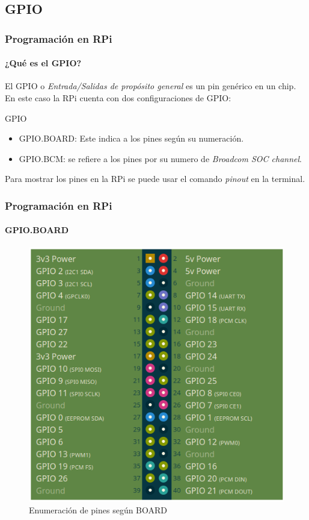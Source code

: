 \documentclass{beamer}
\begin{document}
	\subsection{GPIO}
	\begin{frame}
		\frametitle{Programación en RPi}
		\framesubtitle{¿Qué es el GPIO?}
		El GPIO o \textit{Entrada/Salidas de propósito general} es un pin genérico en un chip. En este caso la RPi cuenta con dos configuraciones de GPIO:
		\begin{mybox}{GPIO}
			\begin{itemize}
				\item GPIO.BOARD: Este indica a los pines según su numeración.
				\item GPIO.BCM: se refiere a los pines por su numero de \textit{Broadcom SOC channel}.
			\end{itemize}
		\end{mybox}
		Para mostrar los pines en la RPi se puede usar el comando \textit{pinout} en la terminal.
	\end{frame}
	\begin{frame}
		\frametitle{Programación en RPi}
		\framesubtitle{GPIO.BOARD}
		\begin{figure}
			\includegraphics[scale=0.4]{rpiboard.png}
			\caption{Enumeración de pines según BOARD}
		\end{figure}
	\end{frame}
\end{document}

